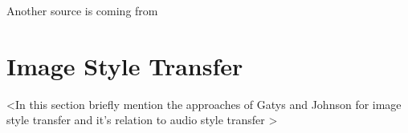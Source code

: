 Another source is coming from \cite{Liu2019}

\section{Image Style Transfer}
\label{sec:imgstyletransfer}

<In this section briefly mention the approaches of Gatys and Johnson for image style transfer and it's relation to audio style transfer \cite{Gatys2016, johnson2016perceptual}>